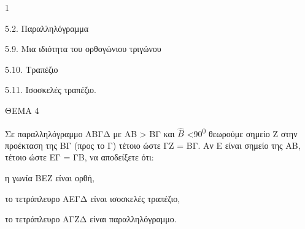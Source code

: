 \begin{ylh}{1}
    \item 5.2. Παραλληλόγραμμα
    \item 5.9. Μια ιδιότητα του ορθογώνιου τριγώνου
    \item 5.10. Τραπέζιο
    \item 5.11. Ισοσκελές τραπέζιο.
\end{ylh}

ΘΕΜΑ 4

Σε παραλληλόγραμμο ΑΒΓΔ με ΑΒ \textgreater{} ΒΓ και $\widehat{Β}$ \textless90\textsuperscript{0} θεωρούμε σημείο Ζ στην προέκταση της ΒΓ (προς το Γ) τέτοιο ώστε ΓΖ = ΒΓ. Αν Ε είναι σημείο της ΑΒ, τέτοιο ώστε ΕΓ = ΓΒ, να αποδείξετε ότι:

\begin{alist}
\item η γωνία ΒΕΖ είναι ορθή, 

\item το τετράπλευρο ΑΕΓΔ είναι ισοσκελές τραπέζιο, 

\item το τετράπλευρο ΑΓΖΔ είναι παραλληλόγραμμο. 
\end{alist}
